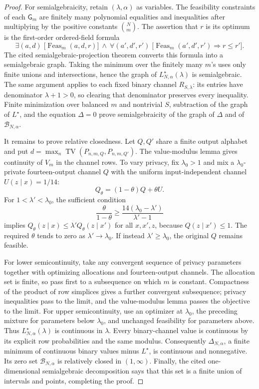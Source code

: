 \documentclass{article}
\begin{document}
\begin{proof}
For semialgebraicity, retain \((\lambda,\alpha)\) as variables.  The feasibility constraints of each \(\mathsf G_m\) are finitely many polynomial equalities and inequalities after multiplying by the positive constants \(\binom Nm\).  The assertion that \(r\) is its optimum is the first-order ordered-field formula
\[
 \exists(a,d)\;\bigl[\operatorname{Feas}_m(a,d,r)\bigr]
 \ \wedge\ 
 \forall(a',d',r')\;\bigl[
 \operatorname{Feas}_m(a',d',r')\Longrightarrow r\le r'
 \bigr].
\]
The cited semialgebraic-projection theorem converts this formula into a semialgebraic graph.  Taking the minimum over the finitely many \(m\)'s uses only finite unions and intersections, hence the graph of \(L^\star_{N,\alpha}(\lambda)\) is semialgebraic.  The same argument applies to each fixed binary channel \(R_{S,\lambda}\): its entries have denominator \(\lambda+1>0\), so clearing that denominator preserves every inequality.  Finite minimization over balanced \(m\) and nontrivial \(S\), subtraction of the graph of \(L^\star\), and the equation \(\Delta=0\) prove semialgebraicity of the graph of \(\Delta\) and of \(\mathcal B_{N,\alpha}\).

It remains to prove relative closedness.  Let \(Q,Q'\) share a finite output alphabet and put \(d=\max_n\operatorname{TV}(P_{n,m,Q},P_{n,m,Q'})\).  The value-modulus lemma gives continuity of \(V_m\) in the channel rows.  To vary privacy, fix \(\lambda_0>1\) and mix a \(\lambda_0\)-private fourteen-output channel \(Q\) with the uniform input-independent channel \(U(z\mid x)=1/14\):
\[
 Q_\theta=(1-\theta)Q+\theta U.
\]
For \(1<\lambda'<\lambda_0\), the sufficient condition
\[
 \frac{\theta}{1-\theta}\ge
 \frac{14(\lambda_0-\lambda')}{\lambda'-1}
\]
implies \(Q_\theta(z\mid x)\le\lambda'Q_\theta(z\mid x')\) for all \(x,x',z\), because \(Q(z\mid x')\le1\).  The required \(\theta\) tends to zero as \(\lambda'\to\lambda_0\).  If instead \(\lambda'\ge\lambda_0\), the original \(Q\) remains feasible.

For lower semicontinuity, take any convergent sequence of privacy parameters together with optimizing allocations and fourteen-output channels.  The allocation set is finite, so pass first to a subsequence on which \(m\) is constant.  Compactness of the product of row simplices gives a further convergent subsequence; privacy inequalities pass to the limit, and the value-modulus lemma passes the objective to the limit.  For upper semicontinuity, use an optimizer at \(\lambda_0\), the preceding mixture for parameters below \(\lambda_0\), and unchanged feasibility for parameters above.  Thus \(L^\star_{N,\alpha}(\lambda)\) is continuous in \(\lambda\).  Every binary-channel value is continuous by its explicit row probabilities and the same modulus.  Consequently \(\Delta_{N,\alpha}\), a finite minimum of continuous binary values minus \(L^\star\), is continuous and nonnegative.  Its zero set \(\mathcal B_{N,\alpha}\) is relatively closed in \((1,\infty)\).  Finally, the cited one-dimensional semialgebraic decomposition says that this set is a finite union of intervals and points, completing the proof.
\end{proof}
\end{document}
